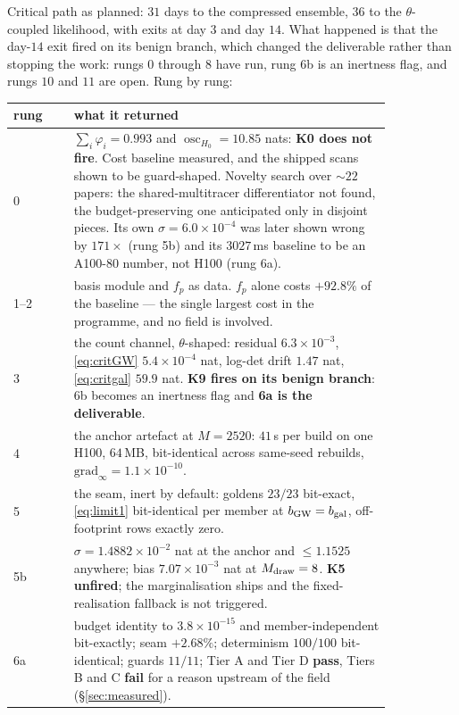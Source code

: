 \documentclass[11pt]{article}
\theoremstyle{definition}
\theoremstyle{remark}
\newcommand{\bgw}{b_{\rm GW}}
\newcommand{\bgal}{b_{\rm gal}}
\newcommand{\Mdraw}{M_{\rm draw}}
\newcommand{\osc}{\mathop{\mathrm{osc}}}
\begin{document}
\noindent Critical path as planned: $31$ days to the compressed ensemble, $36$
to the $\theta$-coupled likelihood, with exits at day $3$ and day $14$. What
happened is that the day-$14$ exit fired on its benign branch, which changed the
deliverable rather than stopping the work: rungs $0$ through $8$ have run, rung
$6$b is an inertness flag, and rungs $10$ and $11$ are open. Rung by rung:

\begin{center}\small
\begin{tabular}{@{}lp{0.84\linewidth}@{}}
\toprule
rung & what it returned \\
\midrule
0 & $\sum_i\varphi_i=0.993$ and $\osc_{H_0}=10.85$ nats: \textbf{K0 does not fire}.
Cost baseline measured, and the shipped scans shown to be guard-shaped. Novelty
search over $\sim22$ papers: the shared-multitracer differentiator not found, the
budget-preserving one anticipated only in disjoint pieces. Its own
$\sigma=6.0\times10^{-4}$ was later shown wrong by $171\times$ (rung 5b) and its
$3027$\,ms baseline to be an A100-80 number, not H100 (rung 6a). \\
1--2 & basis module and $f_p$ as data. $f_p$ alone costs $+92.8\%$ of the
baseline --- the single largest cost in the programme, and no field is involved. \\
3 & the count channel, $\theta$-shaped: residual $6.3\times10^{-3}$,
\eqref{eq:critGW} $5.4\times10^{-4}$ nat, log-det drift $1.47$ nat,
\eqref{eq:critgal} $59.9$ nat. \textbf{K9 fires on its benign branch}: 6b becomes
an inertness flag and \textbf{6a is the deliverable}. \\
4 & the anchor artefact at $M=2520$: $41$\,s per build on one H100, $64$\,MB,
bit-identical across same-seed rebuilds, $\mathrm{grad}_\infty=1.1\times10^{-10}$. \\
5 & the seam, inert by default: goldens $23/23$ bit-exact, \eqref{eq:limit1}
bit-identical per member at $\bgw=\bgal$, off-footprint rows exactly zero. \\
5b & $\sigma=1.4882\times10^{-2}$ nat at the anchor and $\le1.1525$ anywhere;
bias $7.07\times10^{-3}$ nat at $\Mdraw=8$. \textbf{K5 unfired}; the
marginalisation ships and the fixed-realisation fallback is not triggered. \\
6a & budget identity to $3.8\times10^{-15}$ and member-independent bit-exactly;
seam $+2.68\%$; determinism $100/100$ bit-identical; guards $11/11$; Tier A and
Tier D \textbf{pass}, Tiers B and C \textbf{fail} for a reason upstream of the
field (\S\ref{sec:measured}). \\

\end{tabular}
\end{center}
\end{document}
